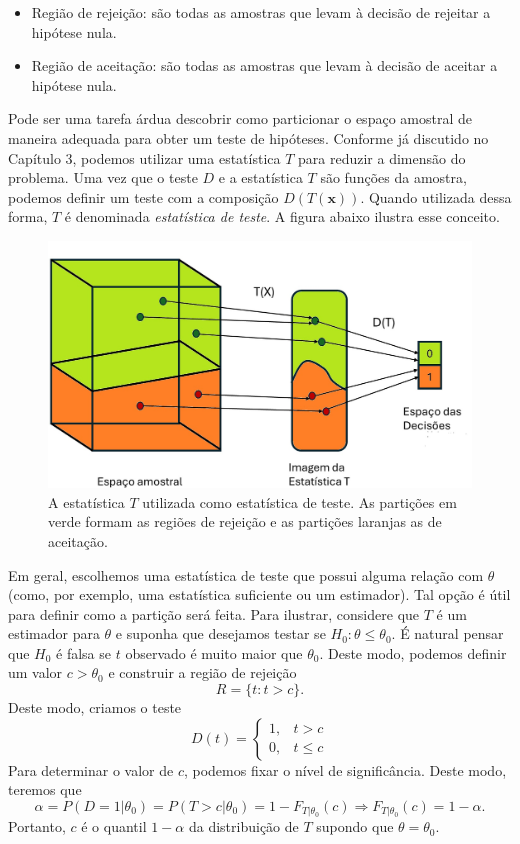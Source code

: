 \documentclass[
  letterpaper,
  DIV=11,
  numbers=noendperiod]{scrartcl}
\begin{document}
\begin{itemize}
\item
  Região de rejeição: são todas as amostras que levam à decisão de
  rejeitar a hipótese nula.
\item
  Região de aceitação: são todas as amostras que levam à decisão de
  aceitar a hipótese nula.
\end{itemize}

Pode ser uma tarefa árdua descobrir como particionar o espaço amostral
de maneira adequada para obter um teste de hipóteses. Conforme já
discutido no Capítulo 3, podemos utilizar uma estatística \(T\) para
reduzir a dimensão do problema. Uma vez que o teste \(D\) e a
estatística \(T\) são funções da amostra, podemos definir um teste com a
composição \(D(T(\textbf{x}))\). Quando utilizada dessa forma, \(T\) é
denominada \emph{estatística de teste}. A figura abaixo ilustra esse
conceito.

\begin{figure}

{\centering \includegraphics{fig_stat_test.jpg}

}

\caption{A estatística \(T\) utilizada como estatística de teste. As
partições em verde formam as regiões de rejeição e as partições laranjas
as de aceitação.}

\end{figure}%

Em geral, escolhemos uma estatística de teste que possui alguma relação
com \(\theta\) (como, por exemplo, uma estatística suficiente ou um
estimador). Tal opção é útil para definir como a partição será feita.
Para ilustrar, considere que \(T\) é um estimador para \(\theta\) e
suponha que desejamos testar se \(H_0:\theta\leq \theta_0\). É natural
pensar que \(H_0\) é falsa se \(t\) observado é muito maior que
\(\theta_0\). Deste modo, podemos definir um valor \(c>\theta_0\) e
construir a região de rejeição \[R=\{t:t>c\}.\] Deste modo, criamos o
teste
\[D(t)=\left\{\begin{array}{ll}1,&t>c\\0,&t\leq c\end{array}\right.\]
Para determinar o valor de \(c\), podemos fixar o nível de
significância. Deste modo, teremos que
\[\alpha=P(D=1|\theta_0)=P(T>c|\theta_0)=1-F_{T|\theta_0}(c)\Rightarrow F_{T|\theta_0}(c)=1-\alpha.\]
Portanto, \(c\) é o quantil \(1-\alpha\) da distribuição de \(T\)
supondo que \(\theta=\theta_0\).
\end{document}
